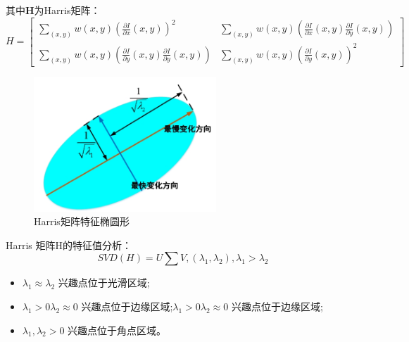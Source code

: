 \documentclass[fontset=windows]{article}
\begin{document}
其中$\mathbf{H}$为Harris矩阵：
\begin{equation*}
H=
\begin{bmatrix}
	\sum_{(x,y)}^{}w(x,y)(\frac{\partial I}{\partial x}(x,y))^2 & \sum_{(x,y)}^{}w(x,y)(\frac{\partial I}{\partial x}(x,y)\frac{\partial I}{\partial y}(x,y)) \\
	\sum_{(x,y)}^{}w(x,y)(\frac{\partial I}{\partial y}(x,y)\frac{\partial I}{\partial y}(x,y)) & \sum_{(x,y)}^{}w(x,y)(\frac{\partial I}{\partial y}(x,y))^2
\end{bmatrix}
\end{equation*}

\begin{figure}[h]
    \centering
    \includegraphics[height=2in]{harrisShape.png}
    \caption{Harris矩阵特征椭圆形}
    \label{fig:harrisShape}
\end{figure}

Harris 矩阵H的特征值分析：
\begin{equation*}
	SVD(H) = U \sum V, (\lambda_1, \lambda_2), \lambda_1 > \lambda_2
\end{equation*}
\begin{itemize}[leftmargin=2cm]
	\item $\lambda_1 \approx \lambda_2$ 兴趣点位于光滑区域;
	\item $\lambda_1 > 0  \lambda_2 \approx 0$ 兴趣点位于边缘区域;$\lambda_1 > 0  \lambda_2 \approx 0$ 兴趣点位于边缘区域;
	\item $\lambda_1, \lambda_2 > 0$ 兴趣点位于角点区域。
\end{itemize}


\end{document}
